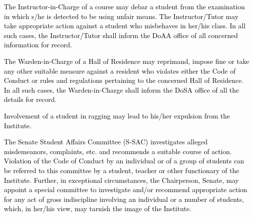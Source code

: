 \documentclass[12pt]{article}
\begin{document}
\vspace{\baselineskip}
\begin{justify}
{\fontsize{10pt}{12.0pt}\selectfont \textcolor[HTML]{00000A}{The Instructor-in-Charge of a course may debar a student from the examination in which s/he is detected to be using unfair means. The Instructor/Tutor may take appropriate action against a student who misbehaves in her/his class. In all such cases, the Instructor/Tutor shall inform the DoAA office of all concerned information for record.}\par}
\end{justify}\par


\vspace{\baselineskip}
\begin{justify}
{\fontsize{10pt}{12.0pt}\selectfont \textcolor[HTML]{00000A}{The Warden-in-Charge of a Hall of Residence may reprimand, impose fine or take any other suitable measure against a resident who violates either the Code of Conduct or rules and regulations pertaining to the concerned Hall of Residence. In all such cases, the Warden-in-Charge shall inform the DoSA office of all the details for record.}\par}
\end{justify}\par


\vspace{\baselineskip}
{\fontsize{10pt}{12.0pt}\selectfont \textcolor[HTML]{00000A}{Involvement of a student in ragging may lead to his/her expulsion from the Institute.}\par}\par


\vspace{\baselineskip}
\begin{justify}
{\fontsize{9pt}{10.8pt}\selectfont \textcolor[HTML]{00000A}{The Senate Student Affairs Committee (S-SAC) investigates alleged misdemeanors, complaints, etc. and recommends a suitable course of action. Violation of the Code of Conduct by an individual or of a group of students can be referred to this committee by a student, teacher or other functionary of the Institute. Further, in exceptional circumstances, the Chairperson, Senate, may appoint a special committee to investigate and/or recommend appropriate action for any act of gross indiscipline involving an individual or a number of students, which, in her/his view, may tarnish the image of the Institute.}\par}
\end{justify}\par
\end{document}

